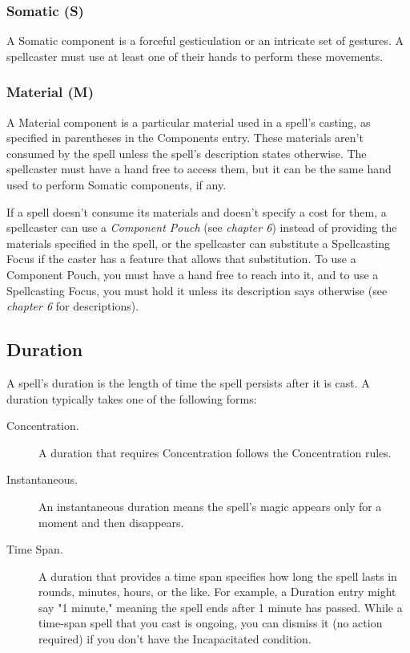 \documentclass[10pt,a4paper,twoside,bg=print,twocolumn,openany,nodeprecatedcode]{dndbook}
\begin{document}
\subsubsection{Somatic (S)}
A Somatic component is a forceful gesticulation or an intricate set of gestures. A spellcaster must use at least one of their hands to perform these movements.

\subsubsection{Material (M)}
A Material component is a particular material used in a spell's casting, as specified in parentheses in the Components entry. These materials aren't consumed by the spell unless the spell's description states otherwise. The spellcaster must have a hand free to access them, but it can be the same hand used to perform Somatic components, if any.

If a spell doesn't consume its materials and doesn't specify a cost for them, a spellcaster can use a \textit{Component Pouch} (see \textit{chapter 6}) instead of providing the materials specified in the spell, or the spellcaster can substitute a Spellcasting Focus if the caster has a feature that allows that substitution. To use a Component Pouch, you must have a hand free to reach into it, and to use a Spellcasting Focus, you must hold it unless its description says otherwise (see \textit{chapter 6} for descriptions).

\subsection{Duration}
A spell's duration is the length of time the spell persists after it is cast. A duration typically takes one of the following forms:


\begin{description}
\item[Concentration.]
A duration that requires Concentration follows the Concentration rules.
\item[Instantaneous.]
An instantaneous duration means the spell's magic appears only for a moment and then disappears.
\item[Time Span.]
A duration that provides a time span specifies how long the spell lasts in rounds, minutes, hours, or the like. For example, a Duration entry might say "1 minute," meaning the spell ends after 1 minute has passed. While a time-span spell that you cast is ongoing, you can dismiss it (no action required) if you don't have the Incapacitated condition.
\end{description}
\end{document}
